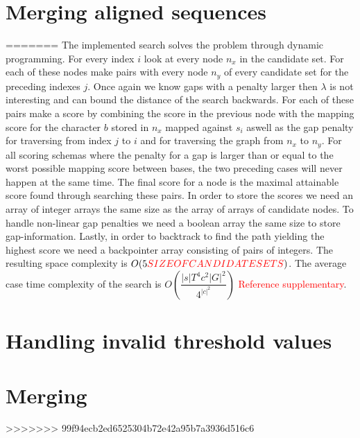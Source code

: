 \documentclass{article}
\begin{document}
\section{Merging aligned sequences}
=======
The implemented search solves the problem through dynamic programming. For every index $i$ look at every node $n_x$ in the candidate set. For each of these nodes make pairs with every node $n_y$ of every candidate set for the preceding indexes $j$. Once again we know gaps with a penalty larger then $\lambda$ is not interesting and can bound the distance of the search backwards. For each of these pairs make a score by combining the score in the previous node with the mapping score for the character $b$ stored in $n_x$ mapped against $s_i$ aswell as the gap penalty for traversing from index $j$ to $i$ and for traversing the graph from $n_x$ to $n_y$. For all scoring schemas where the penalty for a gap is larger than or equal to the worst possible mapping score between bases, the two preceding cases will never happen at the same time. The final score for a node is the maximal attainable score found through searching these pairs. In order to store the scores we need an array of integer arrays the same size as the array of arrays of candidate nodes. To handle non-linear gap penalties we need a boolean array the same size to store gap-information. Lastly, in order to backtrack to find the path yielding the highest score we need a backpointer array consisting of pairs of integers. The resulting space complexity is $O(5\textcolor{red}{SIZE OF CANDIDATE SETS})$. The average case time complexity of the search is $O(\dfrac{|s|T^4c^2|G|^2}{4^{|c|^2}})$ \textcolor{red}{Reference supplementary}.
\section{Handling invalid threshold values}
\section{Merging}
>>>>>>> 99f94ecb2ed6525304b72e42a95b7a3936d516c6
\end{document}
